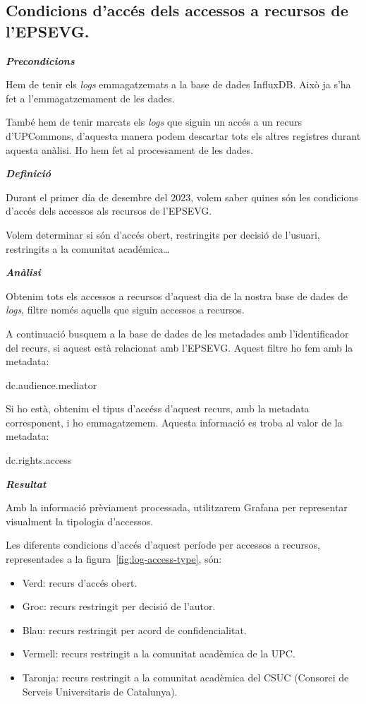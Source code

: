 \documentclass[lettersize,journal]{IEEEtran}
\begin{document}
\subsection{Condicions d'accés dels accessos a recursos de l'EPSEVG.}\label{subsec:use-case-3}

\textit{\textbf{Precondicions}}

Hem de tenir els \textit{logs} emmagatzemats a la base de dades InfluxDB.
Això ja s'ha fet a l'emmagatzemament de les dades.

També hem de tenir marcats els \textit{logs} que siguin un accés a un recurs d'UPCommons, d'aquesta manera podem descartar tots els altres registres durant aquesta anàlisi.
Ho hem fet al processament de les dades.

\textit{\textbf{Definició}}

Durant el primer día de desembre del 2023, volem saber quines són les condicions d'accés dels accessos als recursos de l'EPSEVG.

Volem determinar si són d'accés obert, restringits per decisió de l'usuari, restringits a la comunitat académica\dots

\clearpage
\textit{\textbf{Anàlisi}}

Obtenim tots els accessos a recursos d'aquest dia de la nostra base de dades de \textit{logs}, filtre només aquells que siguin accessos a recursos.

A continuació busquem a la base de dades de les metadades amb l'identificador del recurs, si aquest està relacionat amb l'EPSEVG.
Aquest filtre ho fem amb la metadata:
\begin{center}
    {dc.audience.mediator}
\end{center}

Si ho està, obtenim el tipus d'accéss d'aquest recurs, amb la metadata corresponent, i ho emmagatzemem.
Aquesta informació es troba al valor de la metadata:
\begin{center}
    {dc.rights.access}
\end{center}

\textit{\textbf{Resultat}}

Amb la informació prèviament processada, utilitzarem Grafana per representar visualment la tipologia d'accessos.

Les diferents condicions d'accés d'aquest període per accessos a recursos, representades a la figura~\ref{fig:log-access-type}, són:
\begin{itemize}
    \item Verd: recurs d'accés obert.
    \item Groc: recurs restringit per decisió de l'autor.
    \item Blau: recurs restringit per acord de confidencialitat.
    \item Vermell: recurs restringit a la comunitat acadèmica de la UPC.
    \item Taronja: recurs restringit a la comunitat acadèmica del CSUC (Consorci de Serveis Universitaris de Catalunya).
\end{itemize}
\end{document}
